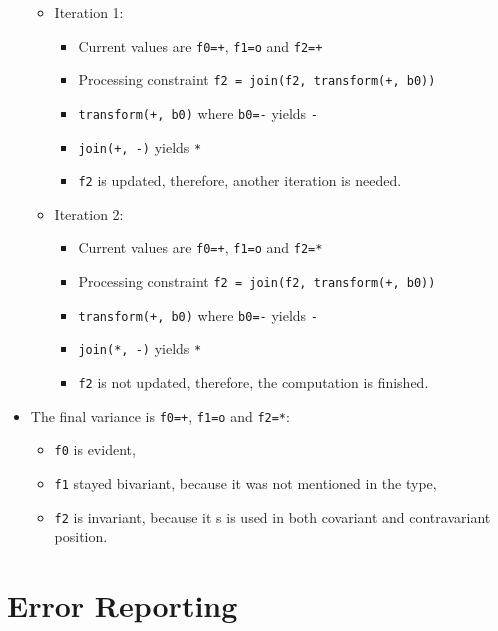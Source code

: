 \documentclass[
  11pt,
]{report}
\providecommand{\tightlist}{%
  \setlength{\itemsep}{0pt}\setlength{\parskip}{0pt}}
\renewenvironment{quote}{\begin{myquote}}{\end{myquote}}
\begin{document}
\begin{quote}
\begin{itemize}
  \begin{itemize}
  \tightlist
  \item
    Iteration 1:

    \begin{itemize}
    \tightlist
    \item
      Current values are \texttt{f0=+}, \texttt{f1=o} and \texttt{f2=+}
    \item
      Processing constraint \texttt{f2\ =\ join(f2,\ transform(+,\ b0))}
    \item
      \texttt{transform(+,\ b0)} where \texttt{b0=-} yields \texttt{-}
    \item
      \texttt{join(+,\ -)} yields \texttt{*}
    \item
      \texttt{f2} is updated, therefore, another iteration is needed.
    \end{itemize}
  \item
    Iteration 2:

    \begin{itemize}
    \tightlist
    \item
      Current values are \texttt{f0=+}, \texttt{f1=o} and \texttt{f2=*}
    \item
      Processing constraint \texttt{f2\ =\ join(f2,\ transform(+,\ b0))}
    \item
      \texttt{transform(+,\ b0)} where \texttt{b0=-} yields \texttt{-}
    \item
      \texttt{join(*,\ -)} yields \texttt{*}
    \item
      \texttt{f2} is not updated, therefore, the computation is
      finished.
    \end{itemize}
  \end{itemize}
\item
  The final variance is \texttt{f0=+}, \texttt{f1=o} and \texttt{f2=*}:

  \begin{itemize}
  \tightlist
  \item
    \texttt{f0} is evident,
  \item
    \texttt{f1} stayed bivariant, because it was not mentioned in the
    type,
  \item
    \texttt{f2} is invariant, because it s is used in both covariant and
    contravariant position.
  \end{itemize}
\end{itemize}
\end{quote}

\section{Error Reporting}\label{error-reporting}
\end{document}
